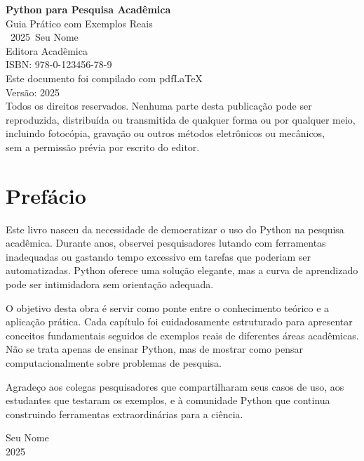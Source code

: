 \documentclass[11pt,a4paper,oneside]{book}
\newcommand{\authorname}{Seu Nome}
\newcommand{\booktitle}{Python para Pesquisa Acadêmica}
\newcommand{\subtitle}{Guia Prático com Exemplos Reais}
\newcommand{\publisher}{Editora Acadêmica}
\newcommand{\editionyear}{2025}
\newcommand{\isbn}{978-0-123456-78-9}
\begin{document}
\newpage
\thispagestyle{empty}
\vspace*{\fill}
\begin{center}
\small
\textbf{\booktitle}\\
\subtitle\\[1cm]

\textcopyright\
\editionyear\ \authorname\\
\publisher\\[0.5cm]

ISBN: \isbn\\[1cm]

Este documento foi compilado com pdfLaTeX\\
Versão: \editionyear\\[0.5cm]

Todos os direitos reservados. Nenhuma parte desta publicação pode ser\\
reproduzida, distribuída ou transmitida de qualquer forma ou por qualquer meio,\\
incluindo fotocópia, gravação ou outros métodos eletrônicos ou mecânicos,\\
sem a permissão prévia por escrito do editor.
\end{center}
\vspace*{\fill}

\chapter*{Prefácio}

Este livro nasceu da necessidade de democratizar o uso do Python na pesquisa acadêmica. Durante anos, observei pesquisadores lutando com ferramentas inadequadas ou gastando tempo excessivo em tarefas que poderiam ser automatizadas. Python oferece uma solução elegante, mas a curva de aprendizado pode ser intimidadora sem orientação adequada.

O objetivo desta obra é servir como ponte entre o conhecimento teórico e a aplicação prática. Cada capítulo foi cuidadosamente estruturado para apresentar conceitos fundamentais seguidos de exemplos reais de diferentes áreas acadêmicas. Não se trata apenas de ensinar Python, mas de mostrar como pensar computacionalmente sobre problemas de pesquisa.

Agradeço aos colegas pesquisadores que compartilharam seus casos de uso, aos estudantes que testaram os exemplos, e à comunidade Python que continua construindo ferramentas extraordinárias para a ciência.

\vspace{1cm}
\begin{flushright}
\authorname\\
\editionyear
\end{flushright}

\tableofcontents

\mainmatter
\pagestyle{fancy}












\end{document}
